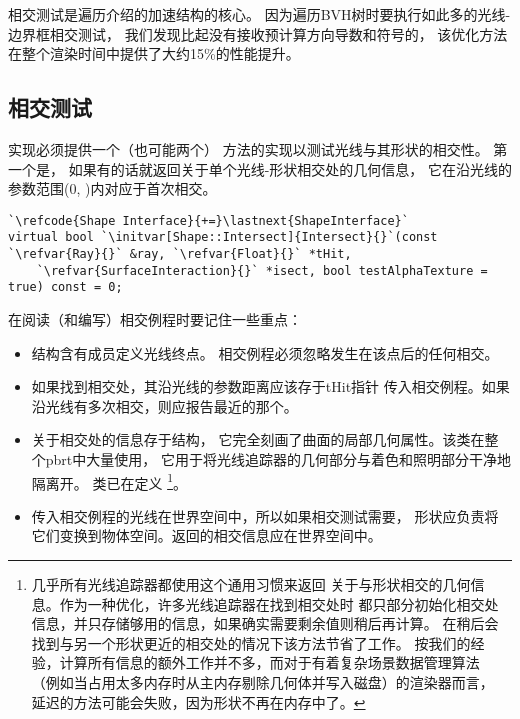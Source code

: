 相交测试是遍历介绍的加速结构的核心。
因为遍历BVH树时要执行如此多的光线-边界框相交测试，
我们发现比起没有接收预计算方向导数和符号的，
该优化方法在整个渲染时间中提供了大约15\%的性能提升。

\subsection{相交测试}\label{sub:相交测试}
实现必须提供一个（也可能两个）
方法的实现以测试光线与其形状的相交性。
第一个是，
如果有的话就返回关于单个光线-形状相交处的几何信息，
它在沿光线的参数范围{\ttfamily (0, )}内对应于首次相交。
\begin{lstlisting}
`\refcode{Shape Interface}{+=}\lastnext{ShapeInterface}`
virtual bool `\initvar[Shape::Intersect]{Intersect}{}`(const `\refvar{Ray}{}` &ray, `\refvar{Float}{}` *tHit,
    `\refvar{SurfaceInteraction}{}` *isect, bool testAlphaTexture = true) const = 0;
\end{lstlisting}

在阅读（和编写）相交例程时要记住一些重点：
\begin{itemize}
    \item {}结构含有成员定义光线终点。
          相交例程必须忽略发生在该点后的任何相交。
    \item 如果找到相交处，其沿光线的参数距离应该存于{\ttfamily tHit}指针
          传入相交例程。如果沿光线有多次相交，则应报告最近的那个。
    \item 关于相交处的信息存于结构，
          它完全刻画了曲面的局部几何属性。该类在整个pbrt中大量使用，
          它用于将光线追踪器的几何部分与着色和照明部分干净地隔离开。
          类已在定义
          \footnote{几乎所有光线追踪器都使用这个通用习惯来返回
              关于与形状相交的几何信息。作为一种优化，许多光线追踪器在找到相交处时
              都只部分初始化相交处信息，并只存储够用的信息，如果确实需要剩余值则稍后再计算。
              在稍后会找到与另一个形状更近的相交处的情况下该方法节省了工作。
              按我们的经验，计算所有信息的额外工作并不多，而对于有着复杂场景数据管理算法
              （例如当占用太多内存时从主内存剔除几何体并写入磁盘）的渲染器而言，
              延迟的方法可能会失败，因为形状不再在内存中了。}。
    \item 传入相交例程的光线在世界空间中，所以如果相交测试需要，
          形状应负责将它们变换到物体空间。返回的相交信息应在世界空间中。
\end{itemize}

